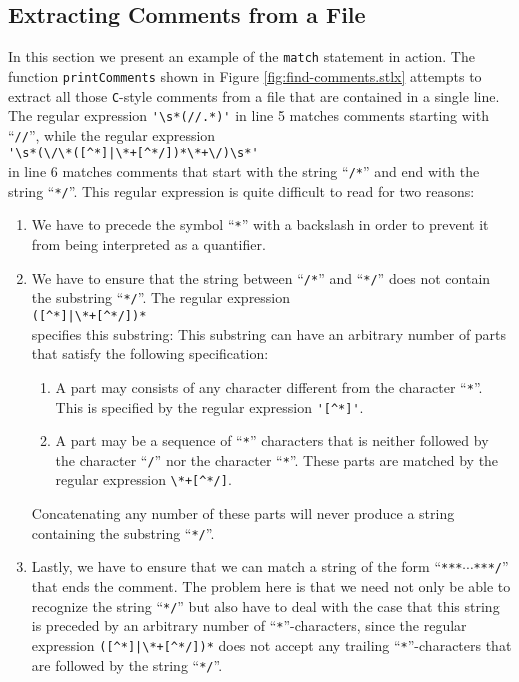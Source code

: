 \subsection{Extracting Comments from a File}
In this section we present an example of the  \texttt{match} statement in action.  The
function \texttt{printComments} shown in Figure \ref{fig:find-comments.stlx} attempts to
extract all those \texttt{C}-style comments from a file that are contained in a single
line.  The regular expression \verb|'\s*(//.*)'| in line 5 matches comments starting
with ``\texttt{//}'', while the regular expression
\\[0.2cm]
\hspace*{1.3cm}
\verb"'\s*(\/\*([^*]|\*+[^*/])*\*+\/)\s*'"
\\[0.2cm]
in line 6 matches comments that start with the string ``\texttt{/*}'' and end with the
string ``\texttt{*/}''.  This regular expression is quite difficult to read for two
reasons:
\begin{enumerate}
\item We have to precede the symbol ``\texttt{*}'' with a backslash in order to prevent it
      from being interpreted as a quantifier.
\item We have to ensure that the string between  ``\texttt{/*}'' and ``\texttt{*/}'' does
      not contain the substring ``\texttt{*/}''.  The regular expression
      \\[0.2cm]
      \hspace*{1.3cm}
      \verb"([^*]|\*+[^*/])*"
      \\[0.2cm]
      specifies this substring:  This substring can have an arbitrary number of parts
      that satisfy the following specification:
      \begin{enumerate}
      \item A part may consists of any character different from
            the character ``\texttt{*}''.  This is specified by the regular expression
            \verb"'[^*]'".
      \item A part may be a sequence of ``\texttt{*}'' characters
            that is neither followed by the character ``\texttt{/}'' nor the character
            ``\texttt{*}''.   These parts are matched by the regular expression
            \verb"\*+[^*/]".
      \end{enumerate}
      Concatenating any number of these parts will never produce a string containing the
      substring ``\texttt{*/}''.
\item Lastly, we have to ensure that we can match a string of the form
      ``\texttt{***}$\cdots$\texttt{***/}'' that ends the comment.  The problem here is that
      we need not only be able to recognize the string ``\texttt{*/}'' but also have to deal with
      the case that this string is preceded by an arbitrary number of ``\texttt{*}''-characters,
      since the regular expression \verb"([^*]|\*+[^*/])*" does not accept any trailing
      ``\texttt{*}''-characters that are followed by the string ``\texttt{*/}''.
\end{enumerate}

